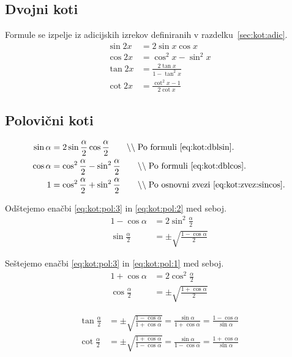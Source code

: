 \documentclass[a4paper,oneside,12pt,fleqn]{article}
\newcommand{\comment}[1]{\ensuremath{\qquad\backslash\backslash\;}\textnormal{#1}}
\def\kos{\cos}
\numberwithin{equation}{section}
\begin{document}
\subsection{Dvojni koti}
Formule se izpelje iz adicijskih izrekov definiranih v razdelku~\ref{sec:kot:adic}.
\begin{align}
  \sin2x &= 2\sin{x}\kos{x} \label{eq:kot:dblsin} \\
  \kos2x &= \kos^2x - \sin^2x \label{eq:kot:dblcos} \\
  \tan2x &= \frac{2\tan{x}}{1-\tan^2x} \nonumber \\
  \cot2x &= \frac{\cot^2x-1}{2\cot{x}} \nonumber
\end{align}

\subsection{Polovični koti}
\label{sec:kot:polov}

\begin{align}
  \sin\alpha &= 2\sin\frac{\alpha}{2}\kos\frac{\alpha}{2} 
  \comment{Po formuli \eqref{eq:kot:dblsin}.} \label{eq:kot:pol:1} \\
  \kos\alpha &= \kos^2\frac{\alpha}{2} - \sin^2\frac{\alpha}{2}
  \comment{Po formuli \eqref{eq:kot:dblcos}.} \label{eq:kot:pol:2} \\
  1 &= \kos^2\frac{\alpha}{2} + \sin^2\frac{\alpha}{2} 
  \comment{Po osnovni zvezi \eqref{eq:kot:zvez:sincos}.} \label{eq:kot:pol:3}
\end{align}

Odštejemo enačbi \eqref{eq:kot:pol:3} in \eqref{eq:kot:pol:2} med seboj.
\begin{align*}
  1 - \kos\alpha &= 2\sin^2\frac{\alpha}{2} \\
  \sin\frac{\alpha}{2} &= \pm\sqrt{\frac{1-\kos\alpha}{2}}
\end{align*}

Seštejemo enačbi \eqref{eq:kot:pol:3} in \eqref{eq:kot:pol:1} med seboj.
\begin{align*}
  1 + \kos\alpha &= 2\kos^2\frac{\alpha}{2} \\
  \kos\frac{\alpha}{2} &= \pm\sqrt{\frac{1+\kos\alpha}{2}}
\end{align*}

\begin{align*}
  \tan\frac{\alpha}{2} &= \pm\sqrt{\frac{1-\kos\alpha}{1+\kos\alpha}} =
  \frac{\sin\alpha}{1+\kos\alpha} = \frac{1-\kos\alpha}{\sin\alpha} \\
  \cot\frac{\alpha}{2} &= \pm\sqrt{\frac{1+\kos\alpha}{1-\kos\alpha}} =
  \frac{\sin\alpha}{1-\kos\alpha} = \frac{1+\kos\alpha}{\sin\alpha} \\
\end{align*}
\end{document}
